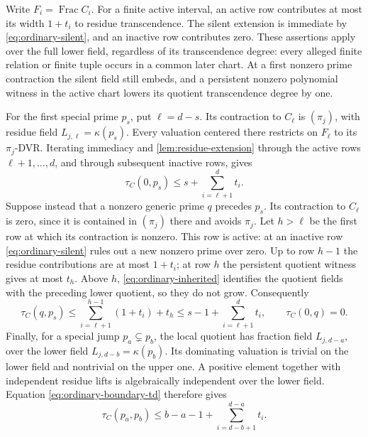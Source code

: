 \documentclass[11pt,reqno]{amsart}
\numberwithin{equation}{section}
\theoremstyle{plain}
\theoremstyle{definition}
\theoremstyle{remark}
\begin{document}
Write \(F_i=\operatorname{Frac}C_i\).
For a finite active interval, an active row contributes at
most its width \(1+t_i\) to residue transcendence. The
silent extension is immediate by \eqref{eq:ordinary-silent},
and an inactive row contributes zero. These assertions apply
over the full lower field, regardless of its transcendence
degree: every alleged finite relation or finite tuple occurs
in a common later chart. At a first nonzero prime contraction
the silent field still embeds, and a persistent nonzero
polynomial witness in the active chart lowers its quotient
transcendence degree by one.

For the first special prime \(p_s\), put \(\ell=d-s\).
Its contraction to \(C_\ell\) is \((\pi_j)\), with residue
field \(L_{j,\ell}=\kappa(p_s)\). Every valuation centered
there restricts on \(F_\ell\) to its \(\pi_j\)-DVR.
Iterating immediacy and \cref{lem:residue-extension} through
the active rows \(\ell+1,\ldots,d\), and through subsequent
inactive rows, gives
\begin{equation}\label{eq:ordinary-first-bound}
 \tau_C(0,p_s)\le s+\sum_{i=\ell+1}^{d}t_i.
\end{equation}
Suppose instead that a nonzero generic prime \(q\) precedes
\(p_s\). Its contraction to \(C_\ell\) is zero, since it is
contained in \((\pi_j)\) there and avoids \(\pi_j\).
Let \(h>\ell\) be the first row at which its contraction is
nonzero. This row is active: at an inactive row
\eqref{eq:ordinary-silent} rules out a new nonzero prime
over zero. Up to row \(h-1\) the residue contributions are
at most \(1+t_i\); at row \(h\) the persistent quotient
witness gives at most \(t_h\). Above \(h\),
\eqref{eq:ordinary-inherited} identifies the quotient fields
with the preceding lower quotient, so they do not grow.
Consequently
\begin{equation}\label{eq:ordinary-generic-bound}
 \tau_C(q,p_s)
   \le\sum_{i=\ell+1}^{h-1}(1+t_i)+t_h
   \le s-1+\sum_{i=\ell+1}^{d}t_i,\qquad
 \tau_C(0,q)=0.
\end{equation}
Finally, for a special jump \(p_a\subsetneq p_b\), the local
quotient has fraction field \(L_{j,d-a}\), over the lower
field \(L_{j,d-b}=\kappa(p_b)\). Its dominating valuation
is trivial on the lower field and nontrivial on the upper
one. A positive element together with independent residue
lifts is algebraically independent over the lower field.
Equation \eqref{eq:ordinary-boundary-td} therefore gives
\begin{equation}\label{eq:ordinary-special-bound}
 \tau_C(p_a,p_b)\le b-a-1+
                 \sum_{i=d-b+1}^{d-a}t_i.
\end{equation}
\end{document}
